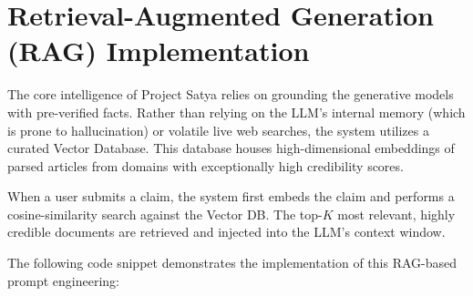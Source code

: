 \section{Retrieval-Augmented Generation (RAG) Implementation}
The core intelligence of Project Satya relies on grounding the generative models with pre-verified facts. Rather than relying on the LLM's internal memory (which is prone to hallucination) or volatile live web searches, the system utilizes a curated Vector Database. This database houses high-dimensional embeddings of parsed articles from domains with exceptionally high credibility scores.

When a user submits a claim, the system first embeds the claim and performs a cosine-similarity search against the Vector DB. The top-$K$ most relevant, highly credible documents are retrieved and injected into the LLM's context window.

The following code snippet demonstrates the implementation of this RAG-based prompt engineering:

